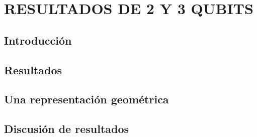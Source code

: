 \chapter{RESULTADOS DE 2 Y 3 QUBITS}

\section{Introducción}

\section{Resultados}

\section{Una representación geométrica}

\section{Discusión de resultados}